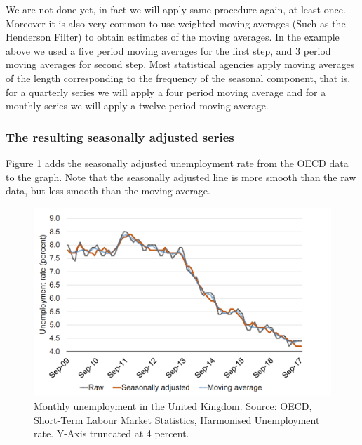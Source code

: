 \documentclass[]{book}
\begin{document}
We are not done yet, in fact we will apply same procedure again, at least once. Moreover it is also very common to use weighted moving averages (Such as the Henderson Filter) to obtain estimates of the moving averages. In the example above we used a five period moving averages for the first step, and 3 period moving averages for second step. Most statistical agencies apply moving averages of the length corresponding to the frequency of the seasonal component, that is, for a quarterly series we will apply a four period moving average and for a monthly series we will apply a twelve period moving average.

\hypertarget{the-resulting-seasonally-adjusted-series}{%
\subsubsection*{The resulting seasonally adjusted series}\label{the-resulting-seasonally-adjusted-series}}

Figure \ref{fig:desc7} adds the seasonally adjusted unemployment rate from the OECD data to the graph. Note that the seasonally adjusted line is more smooth than the raw data, but less smooth than the moving average.

\begin{figure}

{\centering \includegraphics[width=0.9\linewidth]{_resources/chapter_describe/ex2_3} 

}

\caption{Monthly unemployment in the United Kingdom. Source: OECD, Short-Term Labour Market Statistics, Harmonised Unemployment rate.  Y-Axis truncated at 4 percent.}\label{fig:desc7}
\end{figure}
\end{document}
